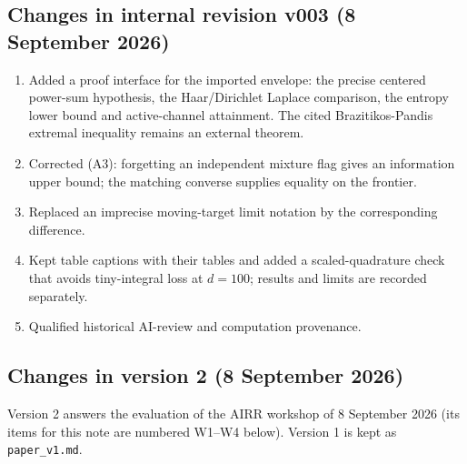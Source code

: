 \documentclass[
  11pt,
  a4paper,
]{article}
\providecommand{\tightlist}{%
  \setlength{\itemsep}{0pt}\setlength{\parskip}{0pt}}
\begin{document}
\subsection{Changes in internal revision v003 (8 September
2026)}\label{changes-in-internal-revision-v003-8-september-2026}

\begin{enumerate}
\def\labelenumi{\arabic{enumi}.}
\tightlist
\item
  Added a proof interface for the imported envelope: the precise
  centered power-sum hypothesis, the Haar/Dirichlet Laplace comparison,
  the entropy lower bound and active-channel attainment. The cited
  Brazitikos-Pandis extremal inequality remains an external theorem.
\item
  Corrected (A3): forgetting an independent mixture flag gives an
  information upper bound; the matching converse supplies equality on
  the frontier.
\item
  Replaced an imprecise moving-target limit notation by the
  corresponding difference.
\item
  Kept table captions with their tables and added a scaled-quadrature
  check that avoids tiny-integral loss at \(d=100\); results and limits
  are recorded separately.
\item
  Qualified historical AI-review and computation provenance.
\end{enumerate}

\subsection{Changes in version 2 (8 September
2026)}\label{changes-in-version-2-8-september-2026}

Version 2 answers the evaluation of the AIRR workshop of 8 September
2026 (its items for this note are numbered W1--W4 below). Version 1 is
kept as {\small\texttt{paper\_\allowbreak{}v1.\allowbreak{}md}}.
\end{document}
